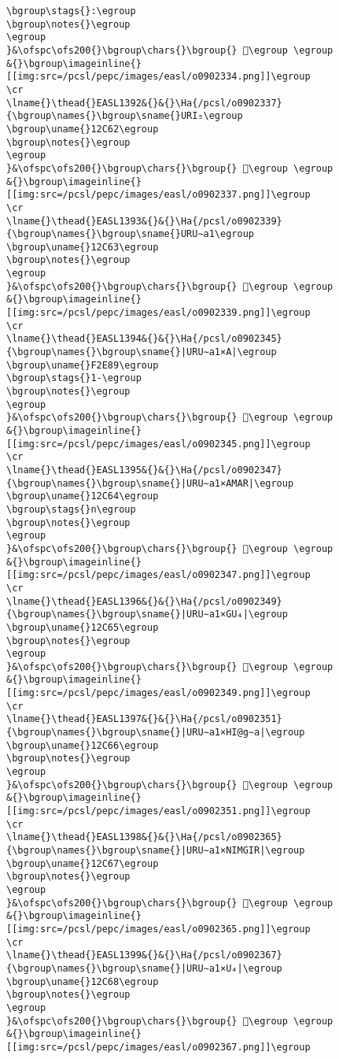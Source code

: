 \begin{verbatim}
\bgroup\stags{}:\egroup
\bgroup\notes{}\egroup
\egroup
}&\ofspc\ofs200{}\bgroup\chars{}\bgroup{} 𒱡\egroup \egroup
&{}\bgroup\imageinline{}[[img:src=/pcsl/pepc/images/easl/o0902334.png]]\egroup
\cr
\lname{}\thead{}EASL1392&{}&{}\Ha{/pcsl/o0902337}{\bgroup\names{}\bgroup\sname{}URI₅\egroup
\bgroup\uname{}12C62\egroup
\bgroup\notes{}\egroup
\egroup
}&\ofspc\ofs200{}\bgroup\chars{}\bgroup{} 𒱢\egroup \egroup
&{}\bgroup\imageinline{}[[img:src=/pcsl/pepc/images/easl/o0902337.png]]\egroup
\cr
\lname{}\thead{}EASL1393&{}&{}\Ha{/pcsl/o0902339}{\bgroup\names{}\bgroup\sname{}URU∼a1\egroup
\bgroup\uname{}12C63\egroup
\bgroup\notes{}\egroup
\egroup
}&\ofspc\ofs200{}\bgroup\chars{}\bgroup{} 𒱣\egroup \egroup
&{}\bgroup\imageinline{}[[img:src=/pcsl/pepc/images/easl/o0902339.png]]\egroup
\cr
\lname{}\thead{}EASL1394&{}&{}\Ha{/pcsl/o0902345}{\bgroup\names{}\bgroup\sname{}|URU∼a1×A|\egroup
\bgroup\uname{}F2E89\egroup
\bgroup\stags{}1-\egroup
\bgroup\notes{}\egroup
\egroup
}&\ofspc\ofs200{}\bgroup\chars{}\bgroup{} 󲺉\egroup \egroup
&{}\bgroup\imageinline{}[[img:src=/pcsl/pepc/images/easl/o0902345.png]]\egroup
\cr
\lname{}\thead{}EASL1395&{}&{}\Ha{/pcsl/o0902347}{\bgroup\names{}\bgroup\sname{}|URU∼a1×AMAR|\egroup
\bgroup\uname{}12C64\egroup
\bgroup\stags{}n\egroup
\bgroup\notes{}\egroup
\egroup
}&\ofspc\ofs200{}\bgroup\chars{}\bgroup{} 𒱤\egroup \egroup
&{}\bgroup\imageinline{}[[img:src=/pcsl/pepc/images/easl/o0902347.png]]\egroup
\cr
\lname{}\thead{}EASL1396&{}&{}\Ha{/pcsl/o0902349}{\bgroup\names{}\bgroup\sname{}|URU∼a1×GU₄|\egroup
\bgroup\uname{}12C65\egroup
\bgroup\notes{}\egroup
\egroup
}&\ofspc\ofs200{}\bgroup\chars{}\bgroup{} 𒱥\egroup \egroup
&{}\bgroup\imageinline{}[[img:src=/pcsl/pepc/images/easl/o0902349.png]]\egroup
\cr
\lname{}\thead{}EASL1397&{}&{}\Ha{/pcsl/o0902351}{\bgroup\names{}\bgroup\sname{}|URU∼a1×HI@g∼a|\egroup
\bgroup\uname{}12C66\egroup
\bgroup\notes{}\egroup
\egroup
}&\ofspc\ofs200{}\bgroup\chars{}\bgroup{} 𒱦\egroup \egroup
&{}\bgroup\imageinline{}[[img:src=/pcsl/pepc/images/easl/o0902351.png]]\egroup
\cr
\lname{}\thead{}EASL1398&{}&{}\Ha{/pcsl/o0902365}{\bgroup\names{}\bgroup\sname{}|URU∼a1×NIMGIR|\egroup
\bgroup\uname{}12C67\egroup
\bgroup\notes{}\egroup
\egroup
}&\ofspc\ofs200{}\bgroup\chars{}\bgroup{} 𒱧\egroup \egroup
&{}\bgroup\imageinline{}[[img:src=/pcsl/pepc/images/easl/o0902365.png]]\egroup
\cr
\lname{}\thead{}EASL1399&{}&{}\Ha{/pcsl/o0902367}{\bgroup\names{}\bgroup\sname{}|URU∼a1×U₄|\egroup
\bgroup\uname{}12C68\egroup
\bgroup\notes{}\egroup
\egroup
}&\ofspc\ofs200{}\bgroup\chars{}\bgroup{} 𒱨\egroup \egroup
&{}\bgroup\imageinline{}[[img:src=/pcsl/pepc/images/easl/o0902367.png]]\egroup

\end{verbatim}
